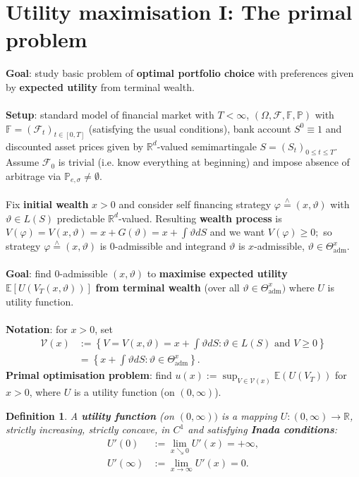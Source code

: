 \documentclass[12pt,a4paper, twoside]{article}
\newtheorem{defn}{Definition}[section]
\theoremstyle{definition}
\newcommand{\EE}{\mathbb{E}} %
\newcommand{\PP}{\mathbb{P}} %
\newcommand{\teq}{\overset{\wedge}{=}}
\begin{document}
\section{Utility maximisation I: The primal problem}
\textbf{Goal}: study basic problem of \textbf{optimal portfolio choice} with preferences given by \textbf{expected utility} from terminal wealth.\\
\\
\textbf{Setup}: standard model of financial market with $T < \infty$, $( \Omega, \mathcal{F}, \mathbb{F}, \PP)$ with $\mathbb{F}=(\mathcal{F}_t)_{t \in [0,T]}$ (satisfying the usual conditions), bank account $S^0 \equiv 1$ and discounted asset prices given by $\mathbb{R}^d$-valued semimartingale $S=(S_t)_{0 \leq t \leq T}$. Assume $\mathcal{F}_0$ is trivial (i.e. know everything at beginning) and impose absence of arbitrage via $\PP_{e, \sigma} \neq \emptyset$. \\
\\
Fix \textbf{initial wealth} $x>0$ and consider self financing strategy $\varphi \teq (x, \vartheta)$ with $\vartheta \in L(S)$ predictable $\mathbb{R}^d$-valued. Resulting \textbf{wealth process} is $V( \varphi)= V(x, \vartheta)= x + G( \vartheta) = x + \int \vartheta dS$ and we want $V( \varphi) \geq 0;$ so strategy $\varphi \teq (x, \vartheta)$ is $0$-admissible and integrand $\vartheta$ is $x$-admissible, $\vartheta \in \Theta_\text{adm}^x$. 
\\\\
\textbf{Goal}: find $0$-admissible $(x, \vartheta)$ to \textbf{maximise expected utility} $\EE[U(V_T( x, \vartheta))]$ \textbf{from terminal wealth} (over all $\vartheta \in \Theta_\text{adm}^x)$ where $U$ is utility function.  
\\\\
\textbf{Notation}: for $x>0$, set 
\begin{align*}
\mathcal{V}(x)&:= \left\{ V= V(x, \vartheta) = x + \int \vartheta dS : \vartheta \in L(S) \text{ and } V \geq 0 \right\} \\
& = \left\{ x + \int \vartheta dS : \vartheta \in \Theta_\text{adm}^x \right\}.
\end{align*}
\textbf{Primal optimisation problem}: find $u(x):= \sup_{V \in \mathcal{V}(x)} \EE( U(V_T))$ for $x >0$, where $U$ is a utility function (on $(0, \infty)$). 
\begin{defn} A \textbf{utility function} (on $(0, \infty))$ is a mapping $U: (0, \infty) \to \mathbb{R}$, strictly increasing, strictly concave, in $C^1$ and satisfying \textbf{Inada conditions}:
\begin{align*}
U'(0)&:= \lim_{x \searrow 0} U'(x)= + \infty, \\
U'( \infty)&:= \lim_{x \to \infty} U'(x) = 0.
\end{align*}
\end{defn}
\end{document}
